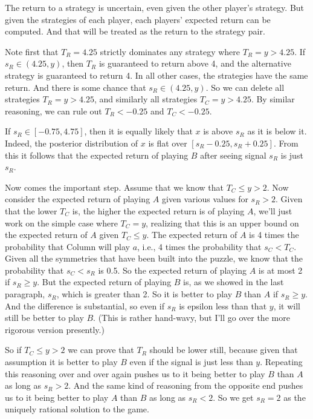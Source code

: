 \documentclass[11pt,]{book}
\begin{document}
The return to a strategy is uncertain, even given the other player's strategy. But given the strategies of each player, each players' expected return can be computed. And that will be treated as the return to the strategy pair.

Note first that \(T_R = 4.25\) strictly dominates any strategy where \(T_R = y > 4.25\). If \(s_R \in (4.25, y)\), then \(T_R\) is guaranteed to return above 4, and the alternative strategy is guaranteed to return 4. In all other cases, the strategies have the same return. And there is some chance that \(s_R \in (4.25, y)\). So we can delete all strategies \(T_R = y > 4.25\), and similarly all strategies \(T_C = y > 4.25\). By similar reasoning, we can rule out \(T_R < -0.25\) and \(T_C < -0.25\).

If \(s_R \in [-0.75, 4.75]\), then it is equally likely that \(x\) is above \(s_R\) as it is below it. Indeed, the posterior distribution of \(x\) is flat over \([s_R - 0.25, s_R + 0.25]\). From this it follows that the expected return of playing \(B\) after seeing signal \(s_R\) is just \(s_R\).

Now comes the important step. Assume that we know that \(T_C \leq y > 2\). Now consider the expected return of playing \(A\) given various values for \(s_R > 2\). Given that the lower \(T_C\) is, the higher the expected return is of playing \(A\), we'll just work on the simple case where \(T_C = y\), realizing that this is an upper bound on the expected return of \(A\) given \(T_C \leq y\). The expected return of \(A\) is 4 times the probability that Column will play \(a\), i.e., 4 times the probability that \(s_C < T_C\). Given all the symmetries that have been built into the puzzle, we know that the probability that \(s_C < s_R\) is 0.5. So the expected return of playing \(A\) is at most 2 if \(s_R \geq y\). But the expected return of playing \(B\) is, as we showed in the last paragraph, \(s_R\), which is greater than 2. So it is better to play \(B\) than \(A\) if \(s_R \geq y\). And the difference is substantial, so even if \(s_R\) is epsilon less than that \(y\), it will still be better to play \(B\). (This is rather hand-wavy, but I'll go over the more rigorous version presently.)

So if \(T_C \leq y > 2\) we can prove that \(T_R\) should be lower still, because given that assumption it is better to play \(B\) even if the signal is just less than \(y\). Repeating this reasoning over and over again pushes us to it being better to play \(B\) than \(A\) as long as \(s_R > 2\). And the same kind of reasoning from the opposite end pushes us to it being better to play \(A\) than \(B\) as long as \(s_R < 2\). So we get \(s_R = 2\) as the uniquely rational solution to the game.
\end{document}
